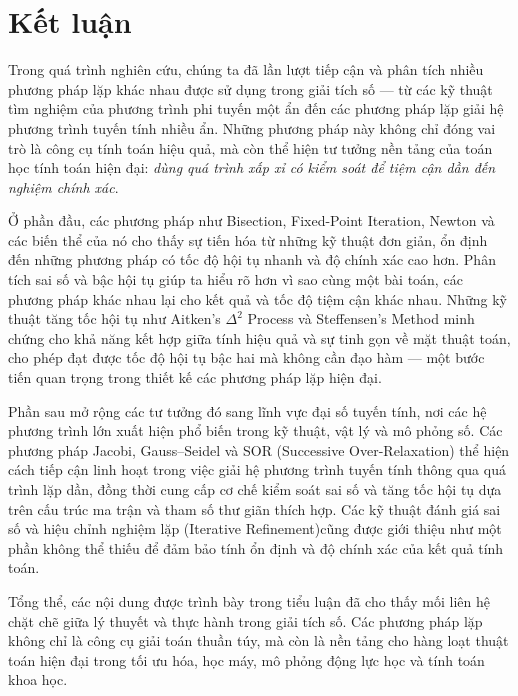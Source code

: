 \chapter{Kết luận}
\label{chap:conclusion}

Trong quá trình nghiên cứu, chúng ta đã lần lượt tiếp cận và phân tích 
nhiều phương pháp lặp khác nhau được sử dụng trong giải tích số — từ các kỹ thuật tìm nghiệm của phương trình phi tuyến một ẩn đến các phương pháp lặp giải hệ phương trình tuyến tính nhiều ẩn.  
Những phương pháp này không chỉ đóng vai trò là công cụ tính toán hiệu quả, mà còn thể hiện tư tưởng nền tảng của toán học tính toán hiện đại: 
\textit{dùng quá trình xấp xỉ có kiểm soát để tiệm cận dần đến nghiệm chính xác}.

Ở phần đầu, các phương pháp như Bisection, Fixed-Point Iteration, Newton và các biến thể của nó cho thấy sự tiến hóa từ những kỹ thuật đơn giản, ổn định đến những phương pháp có tốc độ hội tụ nhanh và độ chính xác cao hơn.
Phân tích sai số và bậc hội tụ giúp ta hiểu rõ hơn vì sao cùng một bài toán, các phương pháp khác nhau lại cho kết quả và tốc độ tiệm cận khác nhau.  
Những kỹ thuật tăng tốc hội tụ như Aitken’s $\Delta^2$ Process và Steffensen’s Method minh chứng cho khả năng kết hợp giữa tính hiệu quả và sự tinh gọn về mặt thuật toán, cho phép đạt được tốc độ hội tụ bậc hai mà không cần đạo hàm — một bước tiến quan trọng trong thiết kế các phương pháp lặp hiện đại.

Phần sau mở rộng các tư tưởng đó sang lĩnh vực đại số tuyến tính,
nơi các hệ phương trình lớn xuất hiện phổ biến trong kỹ thuật, vật lý và mô phỏng số.
Các phương pháp Jacobi, Gauss–Seidel và SOR (Successive Over-Relaxation) 
thể hiện cách tiếp cận linh hoạt trong việc giải hệ phương trình tuyến tính thông qua quá trình lặp dần, đồng thời cung cấp cơ chế kiểm soát sai số và tăng tốc hội tụ dựa trên cấu trúc ma trận và tham số thư giãn thích hợp.
Các kỹ thuật đánh giá sai số và hiệu chỉnh nghiệm lặp (Iterative Refinement)cũng được giới thiệu như một phần không thể thiếu để đảm bảo tính ổn định và độ chính xác của kết quả tính toán.

Tổng thể, các nội dung được trình bày trong tiểu luận 
đã cho thấy mối liên hệ chặt chẽ giữa lý thuyết và thực hành trong giải tích số.  
Các phương pháp lặp không chỉ là công cụ giải toán thuần túy, 
mà còn là nền tảng cho hàng loạt thuật toán hiện đại 
trong tối ưu hóa, học máy, mô phỏng động lực học và tính toán khoa học.

